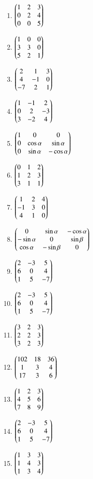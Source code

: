 \begin{multicols}{2}
\begin{enumerate}[label=\thesubsection.\arabic*,ref=\thesubsection.\theenumi]
\item $\begin{pmatrix}1 & 2 & 3 \\ 0 & 2 & 4 \\ 0 & 0 & 5\end{pmatrix}$
\item $\begin{pmatrix}1 & 0 & 0 \\ 3 & 3 & 0 \\ 5 & 2 & 1\end{pmatrix}$
\item $\begin{pmatrix}2 & 1 & 3 \\ 4 & -1 & 0 \\ -7 & 2 & 1\end{pmatrix}$
\item $\begin{pmatrix}1 & -1 & 2 \\ 0 & 2 & -3 \\ 3 & -2 & 4\end{pmatrix}$
\item $\begin{pmatrix}1 & 0 & 0 \\ 0 & \cos \alpha & \sin \alpha \\ 0 & \sin \alpha & -\cos \alpha\end{pmatrix}$ \label{prob:11}
\item 
$\begin{pmatrix}0&1&2\\1&2&3\\3&1&1\end{pmatrix}$ 
\item $\begin{pmatrix}1&2&4\\-1&3&0\\4&1&0\end{pmatrix}$
\item $ \begin{pmatrix}0&\sin\alpha&-\cos\alpha\\ -\sin\alpha&0&\sin\beta\\ \cos\alpha& -\sin\beta&0\end{pmatrix}$
\item $\begin{pmatrix}2 &- 3 & 5\\6 & 0 & 4\\1 & 5 & -7\end{pmatrix}$
\item $\begin{pmatrix}2&-3&5\\6&0&4\\1&5&-7 \end{pmatrix}$
\item $\begin{pmatrix}3&2&3\\2&2&3\\3&2&3\end{pmatrix}$
\item $\begin{pmatrix}102&18&36 \\ 1&3&4 \\ 17&3&6 \end{pmatrix}$
\item $ \begin{pmatrix}1&2&3 \\4&5&6 \\7&8&9 \end{pmatrix}$
\item $\begin{pmatrix} 2&-3&5 \\6&0&4 \\1&5&-7 \end{pmatrix}$ 
\item $\begin{pmatrix}1&3&3 \\1&4&3 \\ 1&3&4\end{pmatrix}$
\end{enumerate}
\end{multicols}
